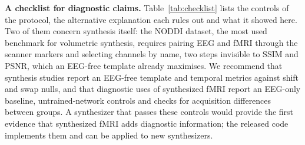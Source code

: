 \documentclass[pdflatex,referee,sn-basic]{sn-jnl}%
\begin{document}
\noindent\textbf{A checklist for diagnostic claims.} Table~\ref{tab:checklist} lists the controls of the protocol, the alternative explanation each rules out and what it showed here. Two of them concern synthesis itself: the NODDI dataset, the most used benchmark for volumetric synthesis, requires pairing EEG and fMRI through the scanner markers and selecting channels by name, two steps invisible to SSIM and PSNR, which an EEG-free template already maximises. We recommend that synthesis studies report an EEG-free template and temporal metrics against shift and swap nulls, and that diagnostic uses of synthesized fMRI report an EEG-only baseline, untrained-network controls and checks for acquisition differences between groups. A synthesizer that passes these controls would provide the first evidence that synthesized fMRI adds diagnostic information; the released code implements them and can be applied to new synthesizers.
\end{document}
